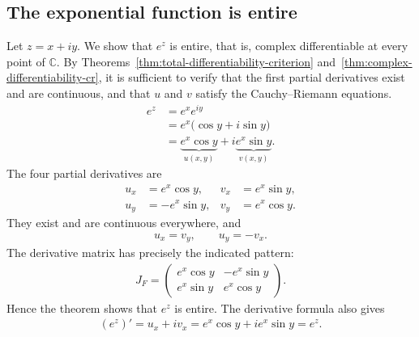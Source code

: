 \documentclass[11pt]{article}
\theoremstyle{plain}
\theoremstyle{definition}
\theoremstyle{remark}
\numberwithin{equation}{section}
\newcommand{\be}{\begin{eqnarray}}
\newcommand{\ee}{\end{eqnarray}}
\newcommand{\C}{\mathbb{C}}
\begin{document}
\subsection{The exponential function is entire}
Let $z=x+iy$. We show that $e^z$ is entire, that is, complex
differentiable at every point of $\C$. By
Theorems~\ref{thm:total-differentiability-criterion}
and~\ref{thm:complex-differentiability-cr}, it is sufficient to
verify that the first partial derivatives exist and are continuous, and
that $u$ and $v$ satisfy the Cauchy--Riemann equations.
\begin{align*}
 e^z&=e^x e^{iy}\\
 &=e^x\bigl(\cos y+i\sin y\bigr)\\
 &=\underbrace{e^x\cos y}_{u(x,y)}
   +i\underbrace{e^x\sin y}_{v(x,y)}.
\end{align*}
The four partial derivatives are
\begin{align*}
 u_x&=e^x\cos y,&v_x&=e^x\sin y,\\
 u_y&=-e^x\sin y,&v_y&=e^x\cos y.
\end{align*}
They exist and are continuous everywhere, and
\be
 u_x=v_y,\qquad u_y=-v_x.
\ee
The derivative matrix has precisely the indicated pattern:
\be
 J_F=\begin{pmatrix}
 e^x\cos y&-e^x\sin y\\
 e^x\sin y&e^x\cos y
 \end{pmatrix}.
\ee
Hence the theorem shows that $e^z$ is entire. The derivative formula also gives
\be
 (e^z)'=u_x+iv_x=e^x\cos y+ie^x\sin y=e^z.
\ee
\end{document}
